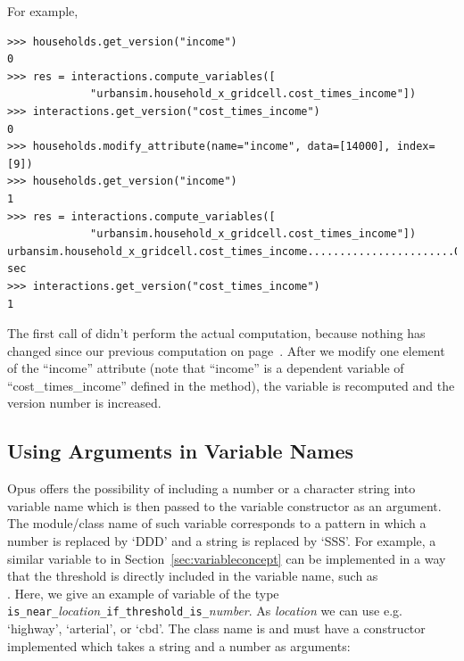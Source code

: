 For example,
\variablesindex
\begin{verbatim}
>>> households.get_version("income")
0
>>> res = interactions.compute_variables([
             "urbansim.household_x_gridcell.cost_times_income"])
>>> interactions.get_version("cost_times_income")
0
>>> households.modify_attribute(name="income", data=[14000], index=[9])
>>> households.get_version("income")
1
>>> res = interactions.compute_variables([
             "urbansim.household_x_gridcell.cost_times_income"])
urbansim.household_x_gridcell.cost_times_income.......................0.0 sec
>>> interactions.get_version("cost_times_income")
1
\end{verbatim}

The first call of  didn't perform the actual
computation, because nothing has changed since our previous computation on
page~\pageref{page:compute-interaction}.
After we modify one element of the ``income'' attribute
(note that ``income'' is a dependent variable of
``cost_times_income'' defined in the  method), the
variable is recomputed and the version number is increased.

\subsection{Using Arguments in Variable Names}
\label{sec:tutorial-numbersinvariables}

Opus offers the possibility of including a number or a character string into
variable name which is then passed to the variable constructor as an argument.
The module/class name of such variable corresponds to a pattern in which a
number is replaced by `DDD' and a string is replaced by `SSS'\@.  For example,
a similar variable to  in Section~\ref{sec:variableconcept} can be
implemented in a way that the threshold is directly included in the variable
name, such as \\
. Here, we give an example of variable
of the type \verb|is_near_|{\em location}\verb|_if_threshold_is_|{\em number}.
As {\em location} we can use e.g. `highway',  `arterial', or `cbd'.
The class name is  and must have a
constructor implemented which takes a string and a number as arguments:

